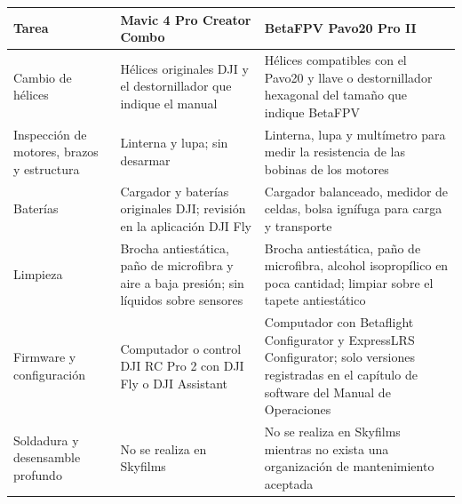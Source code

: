 \begin{longtable}{|>{\raggedright\arraybackslash}p{3.2cm}|>{\raggedright\arraybackslash}p{4.6cm}|>{\raggedright\arraybackslash}p{5.9cm}|}
\hline
\rowcolor[gray]{0.9}\textbf{Tarea} & \textbf{Mavic 4 Pro Creator Combo} & \textbf{BetaFPV Pavo20 Pro II} \\ \hline
\endhead
Cambio de hélices & Hélices originales DJI y el destornillador que indique el manual & Hélices compatibles con el Pavo20 y llave o destornillador hexagonal del tamaño que indique BetaFPV \\ \hline
Inspección de motores, brazos y estructura & Linterna y lupa; sin desarmar & Linterna, lupa y multímetro para medir la resistencia de las bobinas de los motores \\ \hline
Baterías & Cargador y baterías originales DJI; revisión en la aplicación DJI Fly & Cargador balanceado, medidor de celdas, bolsa ignífuga para carga y transporte \\ \hline
Limpieza & Brocha antiestática, paño de microfibra y aire a baja presión; sin líquidos sobre sensores & Brocha antiestática, paño de microfibra, alcohol isopropílico en poca cantidad; limpiar sobre el tapete antiestático \\ \hline
Firmware y configuración & Computador o control DJI RC Pro 2 con DJI Fly o DJI Assistant & Computador con Betaflight Configurator y ExpressLRS Configurator; solo versiones registradas en el capítulo de software del Manual de Operaciones \\ \hline
Soldadura y desensamble profundo & No se realiza en Skyfilms & No se realiza en Skyfilms mientras no exista una organización de mantenimiento aceptada \\ \hline
\end{longtable}

